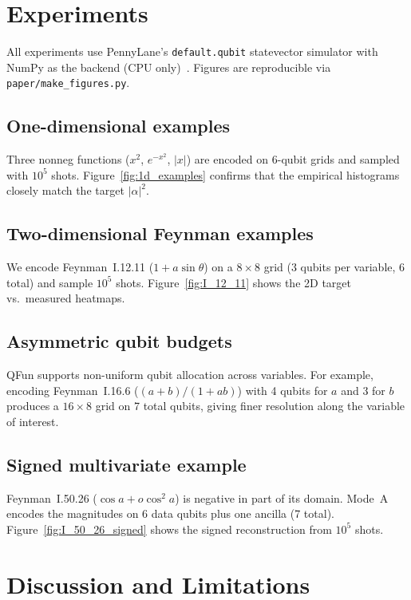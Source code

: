 \documentclass[11pt]{article}
\begin{document}
\section{Experiments}
\label{sec:experiments}

All experiments use PennyLane's \texttt{default.qubit} statevector
simulator with NumPy as the backend (CPU
only)~\cite{bergholm2020pennylane}.  Figures are reproducible via
\texttt{paper/make\_figures.py}.

\subsection{One-dimensional examples}
Three nonneg functions ($x^2$, $e^{-x^2}$, $|x|$) are encoded on
6-qubit grids and sampled with $10^5$ shots.
Figure~\ref{fig:1d_examples} confirms that the empirical histograms
closely match the target $|\alpha|^2$.

\subsection{Two-dimensional Feynman examples}
We encode Feynman~I.12.11 ($1+a\sin\theta$) on a $8\times 8$ grid
(3 qubits per variable, 6 total) and sample $10^5$ shots.
Figure~\ref{fig:I_12_11} shows the 2D target vs.\ measured heatmaps.

\subsection{Asymmetric qubit budgets}
QFun supports non-uniform qubit allocation across variables.  For
example, encoding Feynman~I.16.6 ($(a+b)/(1+ab)$) with 4 qubits for
$a$ and 3 for $b$ produces a $16\times 8$ grid on 7 total qubits,
giving finer resolution along the variable of interest.

\subsection{Signed multivariate example}
Feynman~I.50.26 ($\cos a + o\cos^2 a$) is negative in part of its
domain.  Mode~A encodes the magnitudes on 6 data qubits plus one
ancilla (7 total).  Figure~\ref{fig:I_50_26_signed} shows the signed
reconstruction from $10^5$ shots.

\section{Discussion and Limitations}
\label{sec:discussion}
\end{document}
